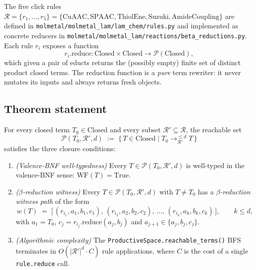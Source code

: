 The five click rules
$\mathcal{R} = \{r_1, \dots, r_5\} = \{\mathrm{CuAAC}, \mathrm{SPAAC},
\mathrm{ThiolEne}, \mathrm{Suzuki}, \mathrm{AmideCoupling}\}$ are
defined in
\texttt{molmetal/molmetal\_lam/lam\_chem/rules.py} and implemented as
concrete reducers in
\texttt{molmetal/molmetal\_lam/reactions/beta\_reductions.py}.  Each
rule $r_i$ exposes a function
\begin{equation}
  r_i.\mathrm{reduce} : \mathrm{Closed} \times \mathrm{Closed}
  \longrightarrow \mathcal{P}(\mathrm{Closed}),
  \label{eq:rule-reduce}
\end{equation}
which given a pair of educts returns the (possibly empty) finite set
of distinct product closed terms.  The reduction function is a
\emph{pure} term rewriter: it never mutates its inputs and always
returns fresh objects.

\subsection{Theorem statement}
\label{sec:closure-statement}

\begin{theorem}
\label{thm:closure}
For every closed term $T_0 \in \mathrm{Closed}$ and every subset
$\mathcal{R}' \subseteq \mathcal{R}$, the reachable set
\begin{equation}
  \mathcal{P}(T_0, \mathcal{R}', d)
  \;:=\; \{\, T \in \mathrm{Closed} \mid
           T_0 \rightarrow_{\mathcal{R}'}^{\le d} T \,\}
  \label{eq:reachable}
\end{equation}
satisfies the three closure conditions:
\begin{enumerate}
  \item[(i)] \emph{(Valence-BNF well-typedness)}  Every
    $T \in \mathcal{P}(T_0, \mathcal{R}', d)$ is well-typed in the
    valence-BNF sense: $\mathrm{WF}(T) = \mathrm{True}$.
  \item[(ii)] \emph{($\beta$-reduction witness)}
    Every $T \in \mathcal{P}(T_0, \mathcal{R}', d)$ with $T \neq T_0$
    has a \emph{$\beta$-reduction witness path} of the form
    \begin{equation}
      w(T) \;=\; \big[\, (r_{i_1}, a_1, b_1, c_1),\,
                          (r_{i_2}, a_2, b_2, c_2),\,
                          \dots,\,
                          (r_{i_k}, a_k, b_k, c_k) \,\big],
      \qquad k \le d,
      \label{eq:witness}
    \end{equation}
    with $a_1 = T_0$, $c_j = r_{i_j}.\mathrm{reduce}(a_j, b_j)$
    and $a_{j+1} \in \{a_j, b_j, c_j\}$.
  \item[(iii)] \emph{(Algorithmic complexity)}  The
    \texttt{ProductiveSpace.reachable\_terms()} BFS terminates in
    $O(|\mathcal{R}'|^d \cdot C)$ rule applications, where $C$ is the
    cost of a single \texttt{rule.reduce} call.
\end{enumerate}
\end{theorem}

